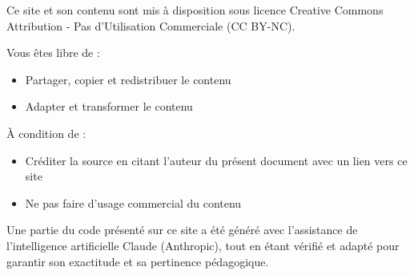 \documentclass[
  12pt,
  letterpaper,
]{book}
\providecommand{\tightlist}{%
  \setlength{\itemsep}{0pt}\setlength{\parskip}{0pt}}\usepackage{longtable,booktabs,array}
\theoremstyle{remark}
\begin{document}

Ce site et son contenu sont mis à disposition sous licence Creative
Commons Attribution - Pas d'Utilisation Commerciale (CC BY-NC).

\begin{tcolorbox}[enhanced jigsaw, colbacktitle=quarto-callout-note-color!10!white, opacityback=0, opacitybacktitle=0.6, toprule=.15mm, coltitle=black, arc=.35mm, titlerule=0mm, breakable, leftrule=.75mm, bottomrule=.15mm, toptitle=1mm, colback=white, bottomtitle=1mm, title=\textcolor{quarto-callout-note-color}{\faInfo}\hspace{0.5em}{Droits d'utilisation}, rightrule=.15mm, left=2mm, colframe=quarto-callout-note-color-frame]

Vous êtes libre de :

\begin{itemize}
\tightlist
\item
  Partager, copier et redistribuer le contenu
\item
  Adapter et transformer le contenu
\end{itemize}

À condition de :

\begin{itemize}
\tightlist
\item
  Créditer la source en citant l'auteur du présent document avec un lien
  vers ce site
\item
  Ne pas faire d'usage commercial du contenu
\end{itemize}

Une partie du code présenté sur ce site a été généré avec l'assistance
de l'intelligence artificielle Claude (Anthropic), tout en étant vérifié
et adapté pour garantir son exactitude et sa pertinence pédagogique.

\end{tcolorbox}
\end{document}
